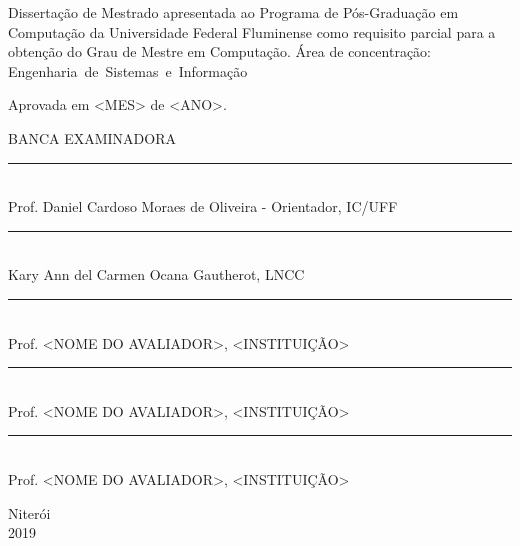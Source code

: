 \noindent
\begin{flushright}
\begin{minipage}[t]{8cm}

Dissertação de Mestrado apresentada ao Programa de P\'{o}s-Gradua\c{c}\~{a}o em Computa\c{c}\~{a}o da Universidade Federal Fluminense como requisito parcial para a obten\c{c}\~{a}o do \mbox{Grau} de Mestre em Computa\c{c}\~{a}o. \'{A}rea de concentra\c{c}\~{a}o: \mbox{Engenharia de Sistemas e Informação} %

\end{minipage}
\end{flushright}
\vspace{1.0 cm}
\noindent
Aprovada em <MES> de <ANO>. \\
\begin{flushright}
  \parbox{11cm}
  {
  \begin{center}
  BANCA EXAMINADORA \\
  \vspace{6mm}
  \rule{11cm}{.1mm} \\
    Prof. Daniel Cardoso Moraes de Oliveira - Orientador, IC/UFF \\
    \vspace{6mm}
  \rule{11cm}{.1mm} \\
    Kary Ann del Carmen Ocana Gautherot, LNCC\\
    \vspace{6mm}
  \rule{11cm}{.1mm} \\
    Prof. <NOME DO AVALIADOR>, <INSTITUI\c{C}\~AO>\\
  \vspace{4mm}
  \rule{11cm}{.1mm} \\
    Prof. <NOME DO AVALIADOR>, <INSTITUI\c{C}\~AO>\\
    \vspace{6mm}
  \rule{11cm}{.1mm} \\
    Prof. <NOME DO AVALIADOR>, <INSTITUI\c{C}\~AO>\\
  \vspace{6mm}
  \end{center}
  }
\end{flushright}
\begin{center}
  \vspace{4mm}
  Niter\'{o}i \\
  2019

\end{center}

